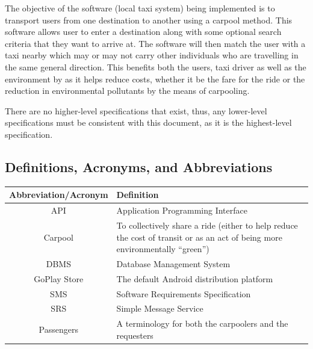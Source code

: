 \documentclass[]{article}
\begin{document}
The objective of the software (local taxi system) being implemented is to transport users from one destination to another using a carpool method. This software allows user to enter a destination along with some optional search criteria that they want to arrive at. The software will then match the user with a taxi nearby which may or may not carry other individuals who are travelling in the same general direction. This benefits both the users, taxi driver as well as the environment by as it helps reduce costs, whether it be the fare for the ride or the reduction in environmental pollutants by the means of carpooling.

There are no higher-level specifications that exist, thus, any lower-level specifications must be consistent with this document, as it is the highest-level specification.

\subsection{Definitions, Acronyms, and Abbreviations}
\label{sub:definitions_acronyms_and_abbreviations}
\begin{center} \begin{tabular} {|c|p{35em}|}
	\hline
	\textbf{Abbreviation/Acronym} & \textbf{Definition} \\
	\hline \hline
	API & Application Programming Interface \\
	\hline
	Carpool & To collectively share a ride (either to help reduce the cost of transit or as an act of being more environmentally “green”) \\
	\hline
	DBMS & Database Management System \\
	\hline
	GoPlay Store & The default Android distribution platform \\
	\hline
	SMS & Software Requirements Specification \\
	\hline
	SRS & Simple Message Service \\
	\hline
	Passengers & A terminology for both the carpoolers and the requesters\\
	\hline
\end{tabular} \end{center}
\end{document}
